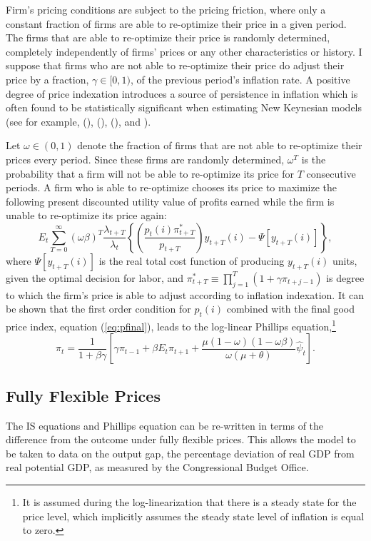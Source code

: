 \documentclass[12pt]{article}
\newcommand{\beq}{\begin{equation}}
\newcommand{\eeq}{\end{equation}}
\newcommand{\citee}[1]{\citet{#1}}
\newcommand{\h}[1]{\hat{#1}}
\begin{document}
Firm's pricing conditions are subject to the \citee{calvo1983} pricing friction, where only a constant fraction of firms are able to re-optimize their price in a given period.  The firms that are able to re-optimize their price is randomly determined, completely independently of firms' prices or any other characteristics or history.  I suppose that firms who are not able to re-optimize their price do adjust their price by a fraction, $\gamma \in [0,1)$, of the previous period's inflation rate.  A positive degree of price indexation introduces a source of persistence in inflation which is often found to be statistically significant when estimating New Keynesian models (see for example, \citeauthor*{smetswouters2005} (\citeyear{smetswouters2003}), (\citeyear{smetswouters2005}), (\citeyear{smetswouters2007}), and \citee{milani2007}).

Let $\omega \in (0,1)$ denote the fraction of firms that are not able to re-optimize their prices every period.  Since these firms are randomly determined, $\omega^T$ is the probability that a firm will not be able to re-optimize its price for $T$ consecutive periods.  A firm who is able to re-optimize chooses its price to maximize the following present discounted utility value of profits earned while the firm is unable to re-optimize its price again: 
\beq \label{eq:intprofit}
E_t \sum_{T=0}^{\infty} \left(\omega \beta \right)^{T} \frac{\lambda_{t+T}}{\lambda_t}
\left\{ \left(\frac{p_{t}(i) \pi_{t+T}^{*}}{p_{t+T}}\right) y_{t+T}(i) - \Psi\left[y_{t+T}(i)\right] \right\},
\eeq
where $\Psi\left[y_{t+T}(i)\right]$ is the real total cost function of producing $y_{t+T}(i)$ units, given the optimal decision for labor, and $\pi_{t+T}^{*} \equiv \prod_{j=1}^{T} (1+\gamma \pi_{t+j-1})$ is degree to which the firm's price is able to adjust according to inflation indexation.  It can be shown that the first order condition for $p_{t}(i)$ combined with the final good price index, equation (\ref{eq:pfinal}), leads to the log-linear Phillips equation,\footnote{It is assumed during the log-linearization that there is a steady state for the price level, which implicitly assumes the steady state level of inflation is equal to zero.}
\beq \label{eq:phillips} \pi_t = \frac{1}{1+\beta \gamma} \left[ \gamma \pi_{t-1} + \beta E_t \pi_{t+1} + \frac{\mu (1-\omega)(1-\omega \beta)}{\omega (\mu + \theta)} \h{\psi}_t \right]. \eeq

\subsection{Fully Flexible Prices}
The IS equations and Phillips equation can be re-written in terms of the difference from the outcome under fully flexible prices.  This allows the model to be taken to data on the output gap, the percentage deviation of real GDP from real potential GDP, as measured by the Congressional Budget Office.  
\end{document}
